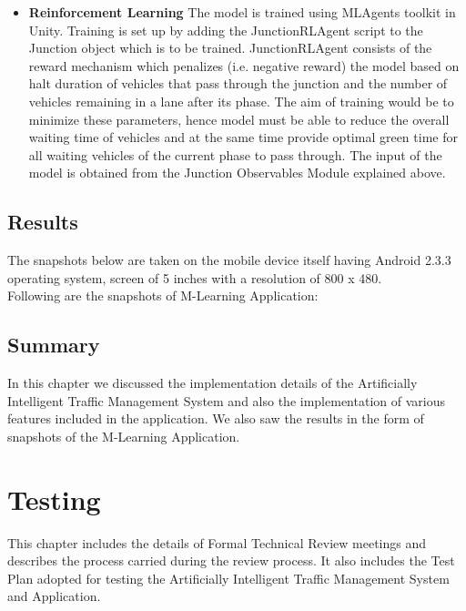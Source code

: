 \documentclass[openany,12pt]{report}
\begin{document}
\begin{itemize}
			
			
			\item{\textbf{Reinforcement Learning}} The model is trained using MLAgents toolkit in Unity. Training is set up by adding the JunctionRLAgent script to the Junction object which is to be trained. JunctionRLAgent consists of the reward mechanism which penalizes (i.e. negative reward) the model based on halt duration of vehicles that pass through the junction and the number of vehicles remaining in a lane after its phase. The aim of training would be to minimize these parameters, hence model must be able to reduce the overall waiting time of vehicles and at the same time provide optimal green time for all waiting vehicles of the current phase to pass through. The input of the model is obtained from the Junction Observables Module explained above.
			
			
			
			
		\end{itemize}
		
		\section{Results}
		\hspace*{0.5in}The snapshots below are taken on the mobile device itself having Android 2.3.3 operating system, screen of 5 inches with a resolution of 800 x 480.\\
		\hspace*{0.5in}Following are the snapshots of M-Learning Application:
		
		\section{Summary}
		\hspace*{0.5in}In this chapter we discussed the implementation details of the Artificially Intelligent Traffic Management System and also the implementation of various features included in the application. We also saw the results in the form of snapshots of the M-Learning Application.
		
		
		\chapter{Testing}
		\hspace*{0.5in}This chapter includes the details of Formal Technical Review meetings and describes the process carried during the review process. It also includes the Test Plan adopted for testing the Artificially Intelligent Traffic Management System and Application.
\end{document}
